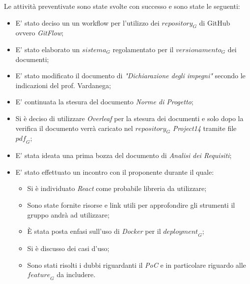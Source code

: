 Le attività preventivate sono state svolte con successo e sono state le seguenti:
\begin{itemize}
    \item E' stato deciso un un workflow per l'utilizzo dei $\textit{repository}_G$ di GitHub ovvero \emph{GitFlow};
    \item E' stato elaborato un $\textit{sistema}_G$ regolamentato per il $\textit{versionamento}_G$ dei documenti;
    \item E' stato modificato il documento di \emph{"Dichiarazione degli impegni"} secondo le indicazioni del prof. Vardanega;
    \item E' continuata la stesura del documento \emph{Norme di Progetto};
    \item Si è deciso di utilizzare \emph{Overleaf} per la stesura dei documenti e solo dopo la verifica il documento verrà caricato nel $\textit{repository}_G$ \emph{Project14} tramite file $\textit{pdf}_G$;
    \item E' stata ideata una prima bozza del documento di \emph{Analisi dei Requisiti};
    \item E' stato effettuato un incontro con il proponente durante il quale:
    \begin{itemize}
        \item Si è individuato \emph{React} come probabile libreria da utilizzare;
        \item Sono state fornite risorse e link utili per approfondire gli strumenti il gruppo andrà ad utilizzare;
        \item È stata posta enfasi sull'uso di \emph{Docker} per il $\textit{deployment}_G$;
        \item Si è discusso dei casi d'uso;
        \item Sono stati risolti i dubbi riguardanti il \emph{PoC} e in particolare riguardo alle $\textit{feature}_G$ da includere.
    \end{itemize}
\end{itemize}
